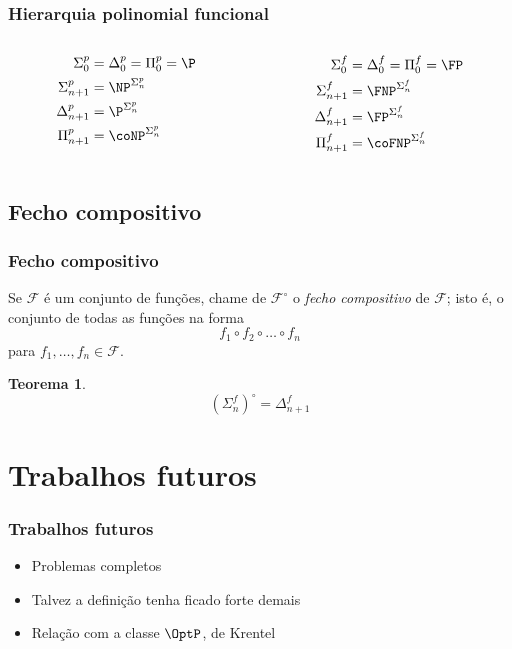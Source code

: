 \documentclass[utf8,notheorems]{beamer}
\newtheorem*{theorem}{Teorema}
\theoremstyle{definition}
\begin{document}
\newlang{}
\begin{frame}
    \frametitle{Hierarquia polinomial funcional}
    \begin{columns}
        \begin{column}{0.2\textwidth}
            \begin{align*}
                \Sigma_0^p &= \Delta_0^p = \Pi_0^p = \P \\
                \Sigma_{n+1}^p &= \NP^{\Sigma_n^p} \\
                \Delta_{n+1}^p &= \P^{\Sigma_n^p} \\
                \Pi_{n+1}^p &= \coNP^{\Sigma_n^p}
            \end{align*}
        \end{column}
        \begin{column}{0.2\textwidth}
            \begin{align*}
                \Sigma_0^f &= \Delta_0^f = \Pi_0^f = \FP \\
                \Sigma_{n+1}^f &= \FNP^{\Sigma_n^f} \\
                \Delta_{n+1}^f &= \FP^{\Sigma_n^f} \\
                \Pi_{n+1}^f &= \coFNP^{\Sigma_n^f}
            \end{align*}
        \end{column}
    \end{columns}
\end{frame}

\subsection{Fecho compositivo}
\begin{frame}
    \frametitle{Fecho compositivo}

    Se $\mathcal F$ é um conjunto de funções,
    chame de $\mathcal F^\circ$
    o \emph{fecho compositivo} de $\mathcal F$;
    isto é, o conjunto de todas as funções na forma
    \begin{equation*}
        f_1 \circ f_2 \circ \dots \circ f_n
    \end{equation*}
    para $f_1, \dots, f_n \in \mathcal F$.

    \begin{theorem}
        \begin{equation*}
            (\Sigma_n^f)^\circ = \Delta_{n+1}^f
        \end{equation*}
    \end{theorem}
\end{frame}

\section{Trabalhos futuros}
\begin{frame}
    \frametitle{Trabalhos futuros}
    \begin{itemize}
        \item Problemas completos
        \item Talvez a definição tenha ficado forte demais
        \item Relação com a classe $\OptP$, de Krentel
    \end{itemize}
\end{frame}
\end{document}
